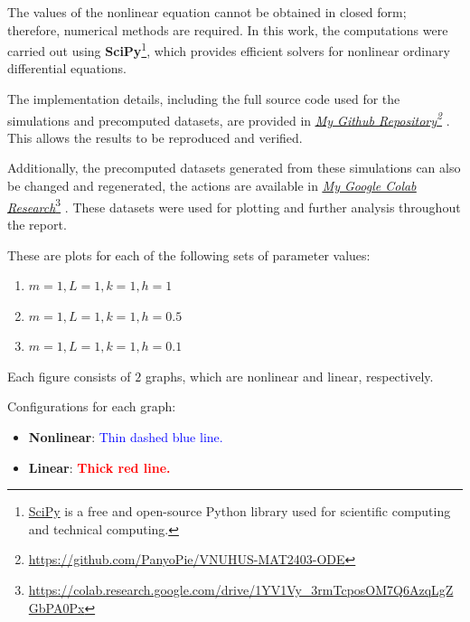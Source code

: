 \documentclass[12pt, a4paper]{report}
\let\oldhref\href
\renewcommand{\href}[2]{\oldhref{#1}{#2}\footnote{\url{#1}}}
\begin{document}
	The values of the nonlinear equation cannot be obtained in closed form; therefore, numerical methods are required. In this work, the computations were carried out using \textbf{SciPy}\footnote{\oldhref{https://scipy.org}{SciPy} is a free and open-source Python library used for scientific computing and technical computing.}, which provides efficient solvers for nonlinear ordinary differential equations.
	
	The implementation details, including the full source code used for the simulations and precomputed datasets, are provided in \textit{\href{https://github.com/PanyoPie/VNUHUS-MAT2403-ODE}{\underline{\textit{My Github Repository}}}} \cite{github_repo}. This allows the results to be reproduced and verified.
	
	Additionally, the precomputed datasets generated from these simulations can also be changed and regenerated, the actions are available in \href{https://colab.research.google.com/drive/1YV1Vy_3rmTcposOM7Q6AzqLgZGbPA0Px}{\underline{\textit{My Google Colab Research}}} \cite{colab}. These datasets were used for plotting and further analysis throughout the report.
	
	These are plots for each of the following sets of parameter values:
	\begin{enumerate}[label=\textbf{\color{blue}\roman*.}]
		\item $m = 1, L = 1, k = 1, h = 1$
		\item $m = 1, L = 1, k = 1, h = 0.5$
		\item $m = 1, L = 1, k = 1, h = 0.1$
	\end{enumerate}
	
	Each figure consists of $2$ graphs, which are nonlinear and linear, respectively.
	
	Configurations for each graph:
	\begin{itemize}
		\item \textbf{Nonlinear}: \textcolor{blue}{Thin dashed blue line.}
		\item \textbf{Linear}: \textbf{\textcolor{red}{Thick red line.}}
	\end{itemize}
	
	\newcommand{\myplot}[4]{
		\begin{tikzpicture}
			\begin{axis}[
				axis lines=middle,
				xlabel={$t$},
				ylabel={$x(t)$},
				every axis y label/.style={
					at={(0,1)},
					anchor=south west,
				},
				xmin=0, xmax=31,
				ymin=-#3, ymax=#3,
				width=15cm,
				height=#4cm,
				scale only axis,
				legend pos=north east
				]
				
				\addplot[
				blue,
				thick,
				dashed
				]
				table {#1};
				\addlegendentry{Nonlinear}
				
				\addplot[
				red,
				ultra thick,
				]
				table {#2};
				\addlegendentry{Linear}
				
			\end{axis}
		\end{tikzpicture}
	}
\end{document}
